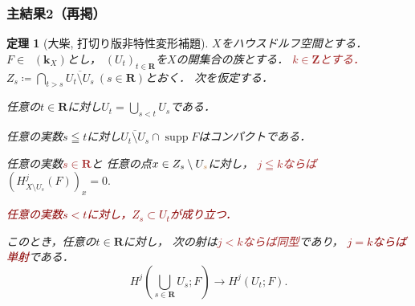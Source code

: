 \documentclass[dvipdfmx,10pt,aspectratio=169,leqno]{beamer}%
\newcommand{\zz}{\mathbf{Z}}
\newcommand{\rr}{\mathbf{R}}
\newcommand{\kk}{\mathbf{k}}
\numberwithin{equation}{subsection}
\newcommand{\supp}{\mathop{\mathrm{supp}}\nolimits}
\newcommand{\Dompl}{\mathop{\mathsf{D}^\mathrm{+}}\nolimits}
\theoremstyle{mystyle}
\newtheorem{THM}[AXM]{定理}
\begin{document}
\begin{frame}
    \frametitle{主結果2（再掲）}
  \begin{THM}[大柴, 打切り版非特性変形補題]
    \(X\)をハウスドルフ空間とする．
    \(F\in\Dompl(\kk_X)\)とし，
    \(\left(U_{t}\right)_{t\in\rr}\)を\(X\)の開集合の族とする．
    \textcolor{brown}{\(k\in\zz\)とする．}
    \(
      Z_{s}\coloneqq \bigcap_{t>s}\overline{U_t\setminus U_s}\ (s\in\rr)
    \)とおく．
    次を仮定する．%
    \begin{enumerate}[(i)]
      \setlength{\leftskip}{10pt}
      \item \label{item:t-nonchar1}
      任意の\(t\in\rr\)に対し\(U_{t}=\bigcup_{s<t}U_{s}\)である．
      \item \label{item:t-nonchar2}
      任意の実数\(s\leqq t\)に対し\(
        \overline{U_{t}\setminus U_{s}}\cap \supp{F}
      \)はコンパクトである．
      \item \label{item:t-nonchar3}
      任意の実数\textcolor{brown}{\(s\in\rr\)}と
      任意の点\(x\in Z_{s}\setminus U_{\textcolor{brown}{s}}\)に対し，
      \textcolor{brown}{\(j\leqq k\)ならば}
      \(
        (H^{j}_{X\setminus U_{s}}(F))_{x}=0. 
      \)
      \textcolor{darkred}{\item \label{item:t-nonchar4} 
      任意の実数\(s< t\)に対し，\(Z_s\subset U_{t}\)が成り立つ．}
    \end{enumerate}
    このとき，任意の\(t\in\rr\)に対し，
    次の射は\textcolor{brown}{\(j<k\)ならば同型}であり，
    \textcolor{darkred}{\(j=k\)ならば単射}である．
    \[
      H^{j}\left(\bigcup_{s\in\rr}U_{s};F\right)
      \to
      H^{j}\left(U_{t};F\right).
    \]
  \end{THM}
\end{frame}
\end{document}
